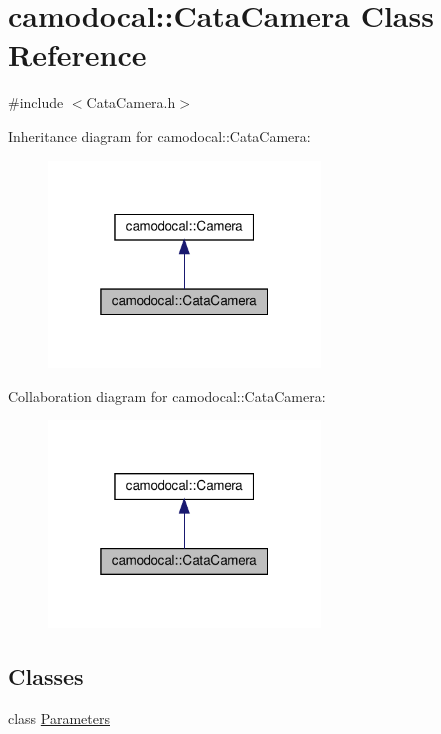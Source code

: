 \hypertarget{classcamodocal_1_1CataCamera}{}\section{camodocal\+:\+:Cata\+Camera Class Reference}
\label{classcamodocal_1_1CataCamera}


{\ttfamily \#include $<$Cata\+Camera.\+h$>$}



Inheritance diagram for camodocal\+:\+:Cata\+Camera\+:\nopagebreak
\begin{figure}[H]
\begin{center}
\leavevmode
\includegraphics[width=205pt]{classcamodocal_1_1CataCamera__inherit__graph}
\end{center}
\end{figure}


Collaboration diagram for camodocal\+:\+:Cata\+Camera\+:\nopagebreak
\begin{figure}[H]
\begin{center}
\leavevmode
\includegraphics[width=205pt]{classcamodocal_1_1CataCamera__coll__graph}
\end{center}
\end{figure}
\subsection*{Classes}
\begin{DoxyCompactItemize}
\item 
class \hyperlink{classcamodocal_1_1CataCamera_1_1Parameters}{Parameters}
\end{DoxyCompactItemize}
